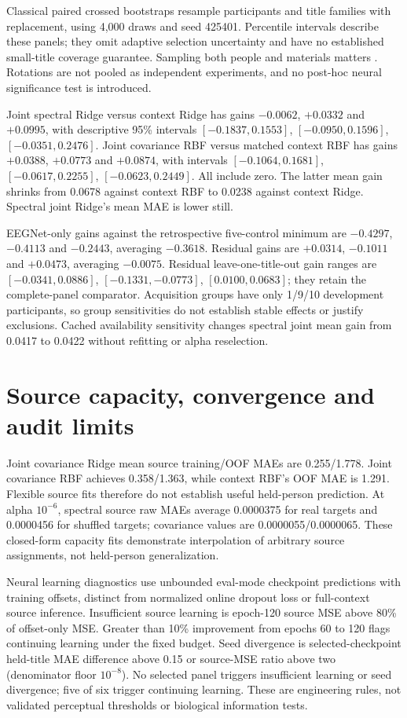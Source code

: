 \documentclass[11pt,a4paper]{article}
\begin{document}
Classical paired crossed bootstraps resample participants and title families with replacement, using 4,000 draws and seed 425401. Percentile intervals describe these panels; they omit adaptive selection uncertainty and have no established small-title coverage guarantee. Sampling both people and materials matters \cite{westfall2014power}. Rotations are not pooled as independent experiments, and no post-hoc neural significance test is introduced.

Joint spectral Ridge versus context Ridge has gains \(-0.0062\), \(+0.0332\) and \(+0.0995\), with descriptive 95\% intervals \([-0.1837,0.1553]\), \([-0.0950,0.1596]\), \([-0.0351,0.2476]\). Joint covariance RBF versus matched context RBF has gains \(+0.0388\), \(+0.0773\) and \(+0.0874\), with intervals \([-0.1064,0.1681]\), \([-0.0617,0.2255]\), \([-0.0623,0.2449]\). All include zero. The latter mean gain shrinks from 0.0678 against context RBF to 0.0238 against context Ridge. Spectral joint Ridge's mean MAE is lower still.

EEGNet-only gains against the retrospective five-control minimum are \(-0.4297\), \(-0.4113\) and \(-0.2443\), averaging \(-0.3618\). Residual gains are \(+0.0314\), \(-0.1011\) and \(+0.0473\), averaging \(-0.0075\). Residual leave-one-title-out gain ranges are \([-0.0341,0.0886]\), \([-0.1331,-0.0773]\), \([0.0100,0.0683]\); they retain the complete-panel comparator. Acquisition groups have only 1/9/10 development participants, so group sensitivities do not establish stable effects or justify exclusions. Cached availability sensitivity changes spectral joint mean gain from 0.0417 to 0.0422 without refitting or alpha reselection.

\section{Source capacity, convergence and audit limits}
Joint covariance Ridge mean source training/OOF MAEs are 0.255/1.778. Joint covariance RBF achieves 0.358/1.363, while context RBF's OOF MAE is 1.291. Flexible source fits therefore do not establish useful held-person prediction. At alpha \(10^{-6}\), spectral source raw MAEs average 0.0000375 for real targets and 0.0000456 for shuffled targets; covariance values are 0.0000055/0.0000065. These closed-form capacity fits demonstrate interpolation of arbitrary source assignments, not held-person generalization.

Neural learning diagnostics use unbounded eval-mode checkpoint predictions with training offsets, distinct from normalized online dropout loss or full-context source inference. Insufficient source learning is epoch-120 source MSE above 80\% of offset-only MSE. Greater than 10\% improvement from epochs 60 to 120 flags continuing learning under the fixed budget. Seed divergence is selected-checkpoint held-title MAE difference above 0.15 or source-MSE ratio above two (denominator floor \(10^{-8}\)). No selected panel triggers insufficient learning or seed divergence; five of six trigger continuing learning. These are engineering rules, not validated perceptual thresholds or biological information tests.
\end{document}
